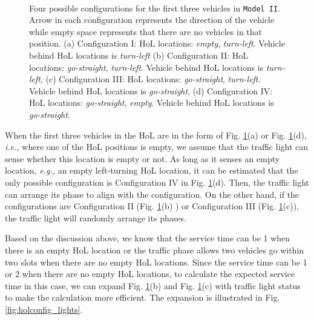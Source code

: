 \documentclass[conference]{IEEEtran}
\newcommand{\ie}{{\em i.e., }}
\newcommand{\eg}{{\em e.g., }}
\newcommand{\modelII}{{\tt{Model II}}}
\begin{document}
\begin{figure}[t!]
\vspace{-10pt}
\begin{center}
 \hspace{15pt}
 \\
  \hspace{15pt}
\end{center}
\begin{center}
\caption{\label{fig:holconfiguration} Four possible configurations for the first three vehicles in \modelII. Arrow in each configuration represents the direction of the vehicle while empty space represents that there are no vehicles in that position. (a) Configuration I: HoL locations: {\em empty}, {\em turn-left}. Vehicle behind HoL locations is {\em turn-left} (b) Configuration II: HoL locations: {\em go-straight}, {\em turn-left}. Vehicle behind HoL locations is {\em turn-left}, (c) Configuration III: HoL locations: {\em go-straight}, {\em turn-left}. Vehicle behind HoL locations is {\em go-straight}, (d) Configuration IV: HoL locations: {\em go-straight}, {\em empty}. Vehicle behind HoL locations is {\em go-straight}.}
\vspace{-20pt}
\end{center}
\end{figure}

When the first three vehicles in the HoL are in the form of Fig. \ref{fig:holconfiguration}(a) or Fig. \ref{fig:holconfiguration}(d), \ie where one of the HoL positions is empty, we assume that the traffic light can sense whether this location is empty or not. As long as it senses an empty location, \eg an empty left-turning HoL location, it can be estimated that the only possible configuration is Configuration IV in Fig. \ref{fig:holconfiguration}(d). Then, the traffic light can arrange its phase to align with the configuration. On the other hand, if the configurations are Configuration II (Fig. \ref{fig:holconfiguration}(b) ) or Configuration III (Fig. \ref{fig:holconfiguration}(c)), the traffic light will randomly arrange its phases.

Based on the discussion above, we know that the service time can be 1 when there is an empty HoL location or the traffic phase allows two vehicles go within two slots when there are no empty HoL locations. Since the service time can be 1 or 2 when there are no empty HoL locations, to calculate the expected service time in this case, we can expand Fig. \ref{fig:holconfiguration}(b) and Fig. \ref{fig:holconfiguration}(c) with traffic light status to make the calculation more efficient. The expansion is illustrated in Fig. \ref{fig:holconfig_lights}.
\end{document}
